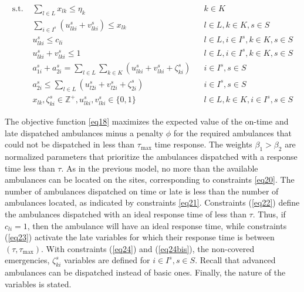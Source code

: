 \begin{align}
\text{s.t. }  &  \sum_{l \in L} x_{lk} \leq \eta_k  && k \in K \label{eq20}  
  \\
  &    \sum_{i\in I^s}(u_{lki}^s + v_{lki}^s) \leq x_{lk} &&   l \in L,   k \in K,  s \in S  
   \label{eq21}  \\  
  &  u_{lki}^s \leq c_{li}  && l \in L,  i \in I^s,   k \in K,  s \in S    \label{eq22}\\
  &  u_{lki}^s + v_{lki}^s \leq 1 && l \in L,    i \in I^s,   k \in K,   s \in S
    \label{eq23}\\
    &  a_{1i}^s +a_{2i}^s = \sum_{l \in L}\sum_{k \in K}( u_{lki}^s + v_{lki}^s + \zeta_{ki}^s )  && i \in I^s, s \in S
    \label{eq24}\\
    &   a_{2i}^s  \leq  \sum_{l \in L}( u_{l2i}^s + v_{l2i}^s  + \zeta_{2i}^s ) &&  i \in I^s, s \in S
    \label{eq24bis}\\
   & x_{lk}, \zeta_{ki}^s \in \mathbb{Z}^+, u_{lki}^s, v_{lki}^s \in \{ 0,1 \}  && l \in L,   k \in K, i \in I^s, s \in S      \nonumber
\end{align}

The objective function \eqref{eq18} maximizes the expected value of the on-time and late dispatched ambulances minus a penalty $\phi$ for the required ambulances that could not be dispatched in less than $\tau_{\max}$ time response. The weights $\beta_1 > \beta_2$ are normalized parameters that prioritize the ambulances dispatched with a response time less than $\tau$. As in the previous model, no more than the available ambulances can be located on the sites, corresponding to constraints \eqref{eq20}. The number of ambulances dispatched on time or late is less than the number of ambulances located, as indicated by constraints \eqref{eq21}. Constraints (\ref{eq22}) define the ambulances dispatched with an ideal response time of less than $\tau$. Thus, if $c_{li}=1$, then the ambulance will have an ideal response time, while constraints (\ref{eq23}) activate the late variables for which their response time is between $(\tau, \tau_{\max})$. With constraints (\ref{eq24}) and (\ref{eq24bis}), the non-covered emergencies, $\zeta_{ki}^s$ variables are defined for $i \in I^s, s \in S$. Recall that advanced ambulances can be dispatched instead of basic ones. %
Finally, the nature of the variables is stated. 


